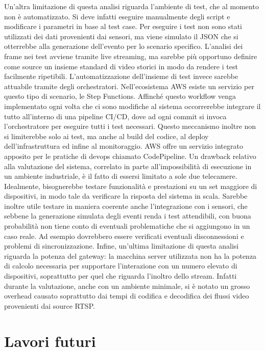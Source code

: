 Un'altra limitazione di questa analisi riguarda l'ambiente di test, che al momento non è automatizzato. Si deve infatti eseguire manualmente degli script e modificare i parametri in base al test case. Per eseguire i test non sono stati utilizzati dei dati provenienti dai sensori, ma viene simulato il JSON che si otterrebbe alla generazione dell'evento per lo scenario specifico. L'analisi dei frame nei test avviene tramite live streaming, ma sarebbe più opportuno definire come source un insieme standard di video storici in modo da rendere i test facilmente ripetibili. L'automatizzazione dell'insieme di test invece sarebbe attuabile tramite degli orchestratori. Nell'ecosistema AWS esiste un servizio per questo tipo di scenario, le Step Functions. Affinché questo workflow venga implementato ogni volta che ci sono modifiche al sistema occorrerebbe integrare il tutto all'interno di una pipeline CI/CD, dove ad ogni commit si invoca l'orchestratore per eseguire tutti i test necessari. Questo meccanismo inoltre non si limiterebbe solo ai test, ma anche al build del codice, al deploy dell'infrastruttura ed infine al monitoraggio. AWS offre un servizio integrato apposito per le pratiche di devops chiamato CodePipeline. Un drawback relativo alla valutazione del sistema, correlato in parte all'impossibilità di esecuzione in un ambiente industriale, è il fatto di essersi limitato a sole due telecamere. Idealmente, bisognerebbe testare funzionalità e prestazioni su un set maggiore di dispositivi, in modo tale da verificare la risposta del sistema in scala. Sarebbe inoltre utile testare in maniera coerente anche l'integrazione con i sensori, che sebbene la generazione simulata degli eventi renda i test attendibili, con buona probabilità non tiene conto di eventuali problematiche che si aggiungono in un caso reale. Ad esempio dovrebbero essere verificati eventuali disconnessioni e problemi di sincronizzazione. 
Infine, un'ultima limitazione di questa analisi riguarda la potenza del gateway: la macchina server utilizzata non ha la potenza di calcolo necessaria per supportare l'interazione con un numero elevato di dispositivi, soprattutto per quel che riguarda l'inoltro dello stream. Infatti durante la valutazione, anche con un ambiente minimale, si è notato un grosso overhead causato soprattutto dai tempi di codifica e decodifica dei flussi video provenienti dai source RTSP.  

\section{Lavori futuri}


